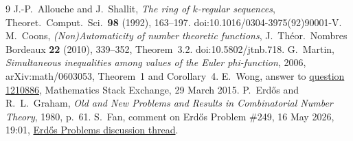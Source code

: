 \documentclass[11pt]{article}
\begin{document}
\begin{thebibliography}{9}\small
{} J.-P.~Allouche and J.~Shallit,
\emph{The ring of $k$-regular sequences}, Theoret.\ Comput.\ Sci.\
\textbf{98} (1992), 163--197. doi:10.1016/0304-3975(92)90001-V.
 M.~Coons, \emph{(Non)Automaticity of number theoretic
functions}, J.\ Th\'eor.\ Nombres Bordeaux \textbf{22} (2010), 339--352,
Theorem~3.2. doi:10.5802/jtnb.718.
 G.~Martin, \emph{Simultaneous inequalities
among values of the Euler phi-function}, 2006, arXiv:math/0603053,
Theorem~1 and Corollary~4.
 E.~Wong, answer to
\href{https://math.stackexchange.com/questions/1210886}{question 1210886},
Mathematics Stack Exchange, 29 March 2015.
 P.~Erd\H{o}s and R.~L.~Graham,
\emph{Old and New Problems and Results in Combinatorial Number Theory},
1980, p.~61.
 S.~Fan, comment on Erd\H{o}s Problem \#249,
16 May 2026, 19:01, \href{https://www.erdosproblems.com/forum/thread/249}
{Erd\H{o}s Problems discussion thread}.
\end{thebibliography}

\companionpapercontext
\end{document}
